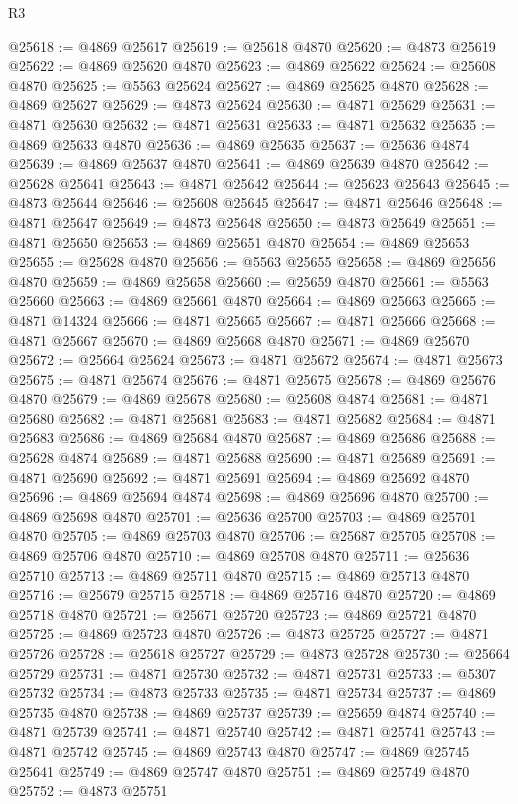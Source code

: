 \begin{lexlean}{R3}
\begin{coremodule}
@25618 := @4869 @25617
@25619 := @25618 @4870
@25620 := @4873 @25619
@25622 := @4869 @25620 @4870
@25623 := @4869 @25622
@25624 := @25608 @4870
@25625 := @5563 @25624
@25627 := @4869 @25625 @4870
@25628 := @4869 @25627
@25629 := @4873 @25624
@25630 := @4871 @25629
@25631 := @4871 @25630
@25632 := @4871 @25631
@25633 := @4871 @25632
@25635 := @4869 @25633 @4870
@25636 := @4869 @25635
@25637 := @25636 @4874
@25639 := @4869 @25637 @4870
@25641 := @4869 @25639 @4870
@25642 := @25628 @25641
@25643 := @4871 @25642
@25644 := @25623 @25643
@25645 := @4873 @25644
@25646 := @25608 @25645
@25647 := @4871 @25646
@25648 := @4871 @25647
@25649 := @4873 @25648
@25650 := @4873 @25649
@25651 := @4871 @25650
@25653 := @4869 @25651 @4870
@25654 := @4869 @25653
@25655 := @25628 @4870
@25656 := @5563 @25655
@25658 := @4869 @25656 @4870
@25659 := @4869 @25658
@25660 := @25659 @4870
@25661 := @5563 @25660
@25663 := @4869 @25661 @4870
@25664 := @4869 @25663
@25665 := @4871 @14324
@25666 := @4871 @25665
@25667 := @4871 @25666
@25668 := @4871 @25667
@25670 := @4869 @25668 @4870
@25671 := @4869 @25670
@25672 := @25664 @25624
@25673 := @4871 @25672
@25674 := @4871 @25673
@25675 := @4871 @25674
@25676 := @4871 @25675
@25678 := @4869 @25676 @4870
@25679 := @4869 @25678
@25680 := @25608 @4874
@25681 := @4871 @25680
@25682 := @4871 @25681
@25683 := @4871 @25682
@25684 := @4871 @25683
@25686 := @4869 @25684 @4870
@25687 := @4869 @25686
@25688 := @25628 @4874
@25689 := @4871 @25688
@25690 := @4871 @25689
@25691 := @4871 @25690
@25692 := @4871 @25691
@25694 := @4869 @25692 @4870
@25696 := @4869 @25694 @4874
@25698 := @4869 @25696 @4870
@25700 := @4869 @25698 @4870
@25701 := @25636 @25700
@25703 := @4869 @25701 @4870
@25705 := @4869 @25703 @4870
@25706 := @25687 @25705
@25708 := @4869 @25706 @4870
@25710 := @4869 @25708 @4870
@25711 := @25636 @25710
@25713 := @4869 @25711 @4870
@25715 := @4869 @25713 @4870
@25716 := @25679 @25715
@25718 := @4869 @25716 @4870
@25720 := @4869 @25718 @4870
@25721 := @25671 @25720
@25723 := @4869 @25721 @4870
@25725 := @4869 @25723 @4870
@25726 := @4873 @25725
@25727 := @4871 @25726
@25728 := @25618 @25727
@25729 := @4873 @25728
@25730 := @25664 @25729
@25731 := @4871 @25730
@25732 := @4871 @25731
@25733 := @5307 @25732
@25734 := @4873 @25733
@25735 := @4871 @25734
@25737 := @4869 @25735 @4870
@25738 := @4869 @25737
@25739 := @25659 @4874
@25740 := @4871 @25739
@25741 := @4871 @25740
@25742 := @4871 @25741
@25743 := @4871 @25742
@25745 := @4869 @25743 @4870
@25747 := @4869 @25745 @25641
@25749 := @4869 @25747 @4870
@25751 := @4869 @25749 @4870
@25752 := @4873 @25751

\end{coremodule}
\end{lexlean}
